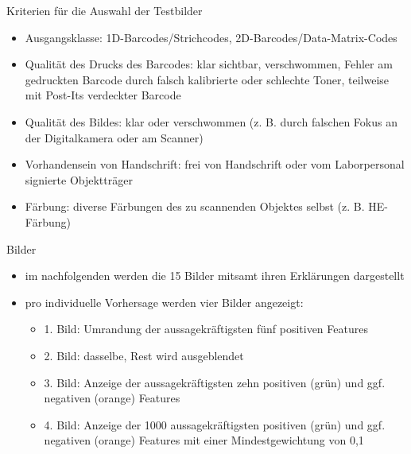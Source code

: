 \documentclass{beamer}
\begin{document}
  \begin{frame}{Kriterien für die Auswahl der Testbilder}
    \begin{itemize}
      \item Ausgangsklasse: 1D-Barcodes/Strichcodes, 2D-Barcodes/Data-Matrix-Codes
      \item Qualität des Drucks des Barcodes: klar sichtbar, verschwommen, Fehler am gedruckten Barcode durch falsch kalibrierte oder schlechte Toner, teilweise mit Post-Its verdeckter Barcode
      \item Qualität des Bildes: klar oder verschwommen (z. B. durch falschen Fokus an der Digitalkamera oder am Scanner)
      \item Vorhandensein von Handschrift: frei von Handschrift oder vom Laborpersonal signierte Objektträger
      \item Färbung: diverse Färbungen des zu scannenden Objektes selbst (z. B. HE-Färbung)
    \end{itemize}
  \end{frame}

  \begin{frame}{Bilder}
    \begin{itemize}
      \item im nachfolgenden werden die 15 Bilder mitsamt ihren Erklärungen dargestellt
      \item pro individuelle Vorhersage werden vier Bilder angezeigt:
      \begin{itemize}
        \item 1. Bild: Umrandung der aussagekräftigsten fünf positiven Features
        \item 2. Bild: dasselbe, Rest wird ausgeblendet
        \item 3. Bild: Anzeige der aussagekräftigsten zehn positiven (grün) und ggf. negativen (orange) Features
        \item 4. Bild: Anzeige der 1000 aussagekräftigsten positiven (grün) und ggf. negativen (orange) Features mit einer Mindestgewichtung von 0,1
      \end{itemize}
    \end{itemize}
  \end{frame}
\end{document}
